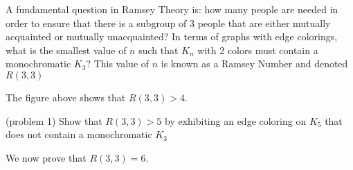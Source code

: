 \documentclass[handout]{ximera}
\begin{document}
A fundamental question in Ramsey Theory is: how many people are needed in order to ensure that 
there is a subgroup of 3 people that are either mutually acquainted or mutually unacquainted?
In terms of graphs with edge colorings, what is the smallest value of $n$ such that $K_n$ with 2 colors 
must contain a monochromatic $K_3$? This value of $n$ is known as a Ramsey Number and denoted $R(3,3)$

\begin{image}
\end{image}

The figure above shows that $R(3,3) > 4$. 

\begin{problem}(problem 1) 
Show that $R(3,3) > 5$ by exhibiting an edge coloring on $K_5$ that does not contain a monochromatic $K_3$
\end{problem}

We now prove that $R(3,3) = 6$. 
\end{document}
